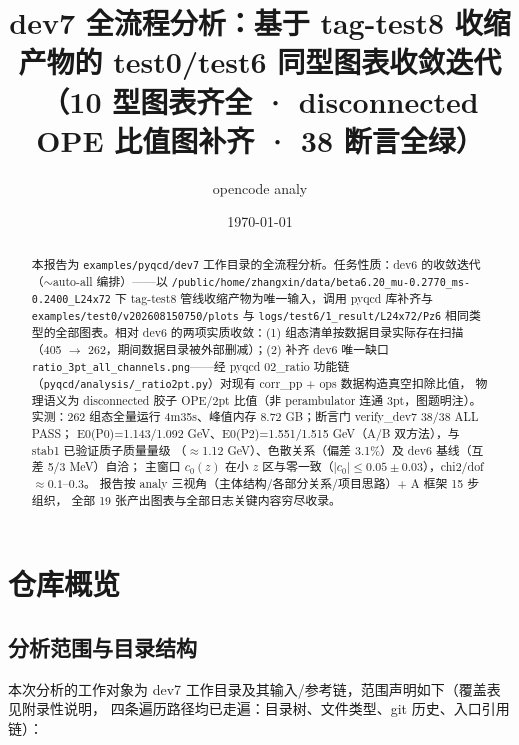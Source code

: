 \documentclass[UTF8]{ctexart}
\title{dev7 全流程分析：基于 tag-test8 收缩产物的 test0/test6 同型图表收敛迭代\\（10 型图表齐全 · disconnected OPE 比值图补齐 · 38 断言全绿）}
\author{opencode analy}
\date{\today}
\begin{document}
\maketitle

\begin{abstract}
本报告为 \texttt{\nolinkurl{examples/pyqcd/dev7}} 工作目录的全流程分析。任务性质：dev6
的收敛迭代（$\sim$auto-all 编排）——以 \texttt{\nolinkurl{/public/home/zhangxin/data/beta6.20\_mu-0.2770\_ms-0.2400\_L24x72}}
下 tag-test8 管线收缩产物为唯一输入，调用 pyqcd 库补齐与
\texttt{\nolinkurl{examples/test0/v202608150750/plots}} 与 \texttt{\nolinkurl{logs/test6/1\_result/L24x72/Pz6}}
相同类型的全部图表。相对 dev6 的两项实质收敛：(1) 组态清单按数据目录实际存在扫描
（405 $\to$ 262，期间数据目录被外部删减）；(2) 补齐 dev6 唯一缺口
\texttt{ratio\_3pt\_all\_channels.png}——经 pyqcd 02\_ratio 功能链
（\texttt{\nolinkurl{pyqcd/analysis/\_ratio2pt.py}}）对现有 corr\_pp + ops 数据构造真空扣除比值，
物理语义为 disconnected 胶子 OPE/2pt 比值（非 perambulator 连通 3pt，图题明注）。
实测：262 组态全量运行 4m35s、峰值内存 8.72 GB；断言门 verify\_dev7 38/38 ALL PASS；
E0(P0)=1.143/1.092 GeV、E0(P2)=1.551/1.515 GeV（A/B 双方法），与 stab1 已验证质子质量量级
（$\approx$1.12 GeV）、色散关系（偏差 3.1\%）及 dev6 基线（互差 5/3 MeV）自洽；
主窗口 $c_0(z)$ 在小 $z$ 区与零一致（$|c_0|\le 0.05\pm0.03$），chi2/dof $\approx 0.1$--$0.3$。
报告按 analy 三视角（主体结构/各部分关系/项目思路）+ A 框架 15 步组织，
全部 19 张产出图表与全部日志关键内容穷尽收录。
\end{abstract}

\tableofcontents

\section{仓库概览}
\subsection{分析范围与目录结构}
本次分析的工作对象为 dev7 工作目录及其输入/参考链，范围声明如下（覆盖表见附录性说明，
四条遍历路径均已走遍：目录树、文件类型、git 历史、入口引用链）：
\end{document}
